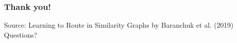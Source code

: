 \begin{frame}[t]
    \frametitle{Thank you!}
    Source: Learning to Route in Similarity Graphs by Baranchuk et al. (2019)\\
    \vspace{3.0em}
    Questions?

\end{frame}


    







